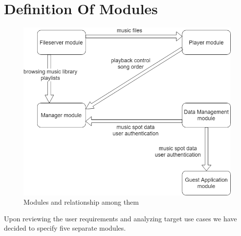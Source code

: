 \section{Definition Of Modules}

\begin{figure}[ht]\centering
\includegraphics[width=1.0\textwidth]{img/CommunicationGraph2}
\caption{Modules and relationship among them}
\label{fig02:communicationAmongModules}
\end{figure}

Upon reviewing the user requirements and analyzing target use cases we have decided to specify five separate modules.

